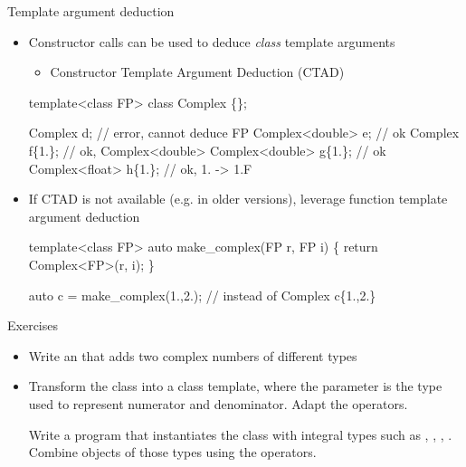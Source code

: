 \begin{frame}[fragile]{Template argument deduction \insertcontinuationtext}

  \begin{itemize}
  \item Constructor calls can be used to deduce \textit{class} template arguments
    \begin{itemize}
    \item Constructor Template Argument Deduction (CTAD)
    \end{itemize}
    \begin{codeblock}
template<class FP> class Complex \{\ddd\};

Complex d;             // error, cannot deduce FP
Complex<double> e;     // ok
Complex f\{1.\};         // ok, Complex<double>
Complex<double> g\{1.\}; // ok
Complex<float> h\{1.\};  // ok, 1. -> 1.F\end{codeblock}
  \item If CTAD is not available (e.g. in older \Cpp{} versions), leverage
    function template argument deduction
    \begin{codeblock}
template<class FP>
auto make_complex(FP r, FP i) \{
  return Complex<FP>(r, i);
\}

auto c = make_complex(1.,2.); // instead of Complex c\{1.,2.\}\end{codeblock}
  \end{itemize}

\end{frame}

\begin{frame}{Exercises}

  \begin{itemize}
  \item Write an  that adds two complex numbers of different types

  \item Transform the  class into a class template, where the
    parameter is the type used to represent numerator and denominator. Adapt the
    operators.

    Write a program that instantiates the  class with integral
    types such as , , , . Combine objects of those types using the operators.
  \end{itemize}

\end{frame}

